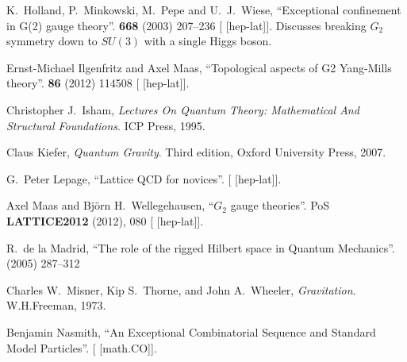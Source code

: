 \begin{thebibliography}{99}
K.~Holland, P.~Minkowski, M.~Pepe and U.~J.~Wiese,
``Exceptional confinement in G(2) gauge theory''.
 \textbf{668} (2003) 207--236
{\tt{}}
[ [hep-lat]].
Discusses breaking $G_{2}$ symmetry down to $SU(3)$ with a single Higgs boson.

Ernst-Michael Ilgenfritz and Axel Maas,
``Topological aspects of G2 Yang-Mills theory''.
 \textbf{86} (2012) 114508
{\tt{}}
[ [hep-lat]].

Christopher J.\ Isham,
\textit{Lectures On Quantum Theory: Mathematical And Structural Foundations}.
ICP Press, 1995.


Claus Kiefer,
\textit{Quantum Gravity}.
Third edition, Oxford University Press, 2007.



G.~Peter Lepage,
``Lattice QCD for novices''.
[ [hep-lat]].


Axel Maas and Bj\"{o}rn H.~Wellegehausen,
``$G_2$ gauge theories''.
PoS \textbf{LATTICE2012} (2012), 080
{\tt{}}
[ [hep-lat]].

R.~de la Madrid,
``The role of the rigged Hilbert space in Quantum Mechanics''.
  (2005) 287--312 
{\tt{}}

Charles W.~Misner, Kip S.~Thorne, and John A.~Wheeler,
\textit{Gravitation}.
W.H.Freeman, 1973.

Benjamin Nasmith,
``An Exceptional Combinatorial Sequence and Standard Model Particles''.
[ [math.CO]].


\end{thebibliography}
